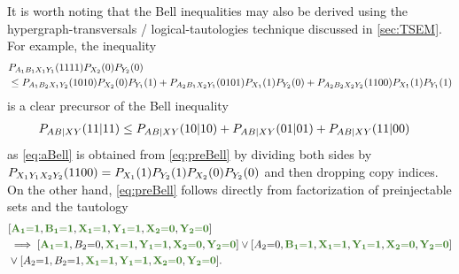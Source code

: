 It is worth noting that the Bell inequalities may also be derived using the hypergraph-transversals / logical-tautologies technique discussed in \cref{sec:TSEM}. For example, the inequality
\begin{align}\label{eq:preBell}\begin{split}
& \p[A_1 B_1 X_1 Y_1]{1111}\p[X_2]{0} \p[Y_2]{0} \\
&\leq
 \p[A_1 B_2 X_1 Y_2]{1010}\p[X_2]{0} \p[Y_1]{1} +\p[A_2 B_1 X_2 Y_1]{0101}\p[X_1]{1}\p[Y_2]{0}+  \p[A_2 B_2 X_2 Y_2]{1100}\p[X_1]{1} \p[Y_1]{1}
\end{split}\end{align}
is a clear precursor of the Bell inequality
\begin{align}\label{eq:aBell}
 \p[A B | X Y]{11|11} &\leq \p[A B | X Y]{10|10} +\p[A B | X Y]{01|01}+  \p[A B | X Y]{11|00}
\end{align}
as \cref{eq:aBell} is obtained from \cref{eq:preBell} by dividing both sides by $\p[X_1 Y_1 X_2 Y_2]{1100}=\p[X_1]{1} \p[Y_2]{1}\p[X_2]{0} \p[Y_2]{0}$ and then dropping copy indices. On the other hand, \cref{eq:preBell} follows directly from factorization of preinjectable sets and the tautology
\begin{align}\begin{split}
&[ \mgreen{A_1 \eql 1}, \mgreen{B_1 \eql 1}, \mgreen{X_1 \eql 1}, \mgreen{Y_1\eql 1}, \mgreen{X_2 \eql 0}, \mgreen{Y_2 \eql 0}]\\
 & \implies 
 [ \mgreen{A_1 \eql 1}, B_2 \eql 0, \mgreen{X_1 \eql 1}, \mgreen{Y_1\eql 1}, \mgreen{X_2 \eql 0}, \mgreen{Y_2 \eql 0}]
\lor [ A_2 \eql 0, \mgreen{B_1 \eql 1}, \mgreen{X_1 \eql 1}, \mgreen{Y_1\eql 1}, \mgreen{X_2 \eql 0}, \mgreen{Y_2 \eql 0}] \\&\lor [ A_2 \eql 1, B_2 \eql 1, \mgreen{X_1 \eql 1}, \mgreen{Y_1\eql 1}, \mgreen{X_2 \eql 0}, \mgreen{Y_2 \eql 0}].
\end{split}\end{align}

